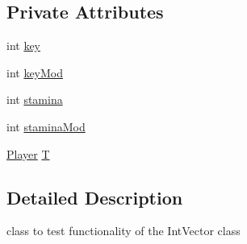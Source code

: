 \subsection*{Private Attributes}
\begin{DoxyCompactItemize}
\item 
int \hyperlink{classPlayerTest_aeba80cc755ca737972055b668af786f0}{key}
\item 
int \hyperlink{classPlayerTest_ae4e634b9de6e1a835fead6433fb68108}{key\-Mod}
\item 
int \hyperlink{classPlayerTest_a21d883f41fe9bc9fec5aafc6377aca6a}{stamina}
\item 
int \hyperlink{classPlayerTest_a34b22c1470a735f5000b85c8a35c09d6}{stamina\-Mod}
\item 
\hyperlink{classPlayer}{Player} \hyperlink{classPlayerTest_aa4d4751434ca1508f9962ffc03c37447}{T}
\end{DoxyCompactItemize}


\subsection{Detailed Description}
class to test functionality of the Int\-Vector class 

